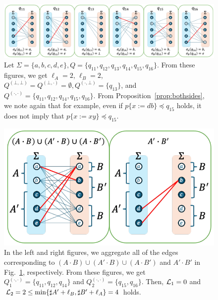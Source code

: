 \documentclass[a4paper]{article}
\begin{document}

\newpage

\begin{figure}[t]
  \begin{center}
    \includegraphics[scale=0.54]{figs/lem11-prop4-eachreg2.pdf}
    \caption{Let $\Sigma=\{a,b,c,d,e\}, Q=\{q_{11},q_{12},q_{13},q_{14},q_{15},q_{16}\}$. From these figures, we get $\ell_A=2$, $\ell_B=2$, $Q^{(\bot,\bot)}=Q^{(\bot,\cdot)}=\emptyset, Q^{(\cdot,\bot)}=\{q_{13}\}$, and $Q^{(\cdot,\cdot)}=\{q_{11},q_{12},q_{14},q_{15},q_{16}\}$. From Proposition~\ref{prop:bothsides}, we note again that for example, even if $p \{ x:=db \} \preceq q_{15}$ holds, it does not imply that $p \{ x:=xy \} \preceq q_{15}$.}\label{fig:lem11-prop4-eachreg2}
  \end{center}
\end{figure}

\begin{figure}[t]
  \begin{center}
    \includegraphics[scale=0.525]{figs/lem11-prop4-totalreg2.pdf}
    \caption{In the left and right figures, we aggregate all of the edges corresponding to $(A\cdot B)\cup (A'\cdot B)\cup (A\cdot B')$ and $A'\cdot B'$ in Fig.~\ref{fig:lem11-prop4-eachreg2}, respectively. From these figures, we get $Q_{1}^{(\cdot,\cdot)}=\{q_{11},q_{12},q_{14}\}$ and $Q_{2}^{(\cdot,\cdot)}=\{q_{15},q_{16}\}$. Then, ${\cal L}_{1} = 0$ and ${\cal L}_{2} = 2 \leq \min\{\sharp A' + \ell_B, \sharp B' + \ell_A\} = 4$ holds.}\label{fig:lem11-prop4-totalreg2}
  \end{center}
\end{figure}

\end{document}
